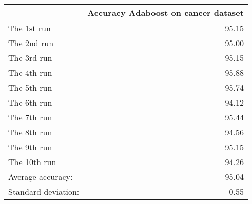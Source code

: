 \begin{tabular}{lr}
\toprule
{} &  Accuracy Adaboost on cancer dataset \\
\midrule
The 1st run         &                                95.15 \\
The 2nd run         &                                95.00 \\
The 3rd run         &                                95.15 \\
The 4th run         &                                95.88 \\
The 5th run         &                                95.74 \\
The 6th run         &                                94.12 \\
The 7th run         &                                95.44 \\
The 8th run         &                                94.56 \\
The 9th run         &                                95.15 \\
The 10th run        &                                94.26 \\
Average accuracy:   &                                95.04 \\
Standard deviation: &                                 0.55 \\
\bottomrule
\end{tabular}
